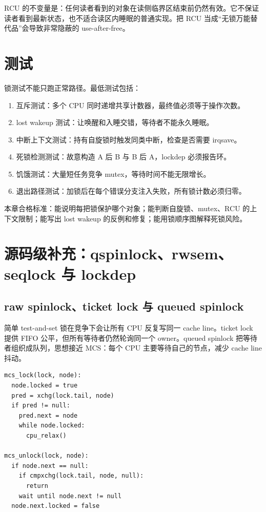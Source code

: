 RCU 的不变量是：任何读者看到的对象在读侧临界区结束前仍然有效。它不保证读者看到最新状态，也不适合读区内睡眠的普通实现。把 RCU 当成“无锁万能替代品”会导致非常隐蔽的 use-after-free。

\section{测试}

锁测试不能只跑正常路径。最低测试包括：

\begin{enumerate}
\tightlist
\item 互斥测试：多个 CPU 同时递增共享计数器，最终值必须等于操作次数。
\item lost wakeup 测试：让唤醒和入睡交错，等待者不能永久睡眠。
\item 中断上下文测试：持有自旋锁时触发同类中断，检查是否需要 irqsave。
\item 死锁检测测试：故意构造 A 后 B 与 B 后 A，lockdep 必须报告环。
\item 饥饿测试：大量短任务竞争 mutex，等待时间不能无限增长。
\item 退出路径测试：加锁后在每个错误分支注入失败，所有锁计数必须归零。
\end{enumerate}

\begin{rubricbox}
本章合格标准：能说明每把锁保护哪个对象；能判断自旋锁、mutex、RCU 的上下文限制；能写出 lost wakeup 的反例和修复；能用锁顺序图解释死锁风险。
\end{rubricbox}

\section{源码级补充：qspinlock、rwsem、seqlock 与 lockdep}

\subsection{raw spinlock、ticket lock 与 queued spinlock}

简单 test-and-set 锁在竞争下会让所有 CPU 反复写同一 cache line。ticket lock 提供 FIFO 公平，但所有等待者仍然轮询同一个 owner。queued spinlock 把等待者组织成队列，思想接近 MCS：每个 CPU 主要等待自己的节点，减少 cache line 抖动。

\begin{lstlisting}
mcs_lock(lock, node):
  node.locked = true
  pred = xchg(lock.tail, node)
  if pred != null:
    pred.next = node
    while node.locked:
      cpu_relax()

mcs_unlock(lock, node):
  if node.next == null:
    if cmpxchg(lock.tail, node, null):
      return
    wait until node.next != null
  node.next.locked = false
\end{lstlisting}

